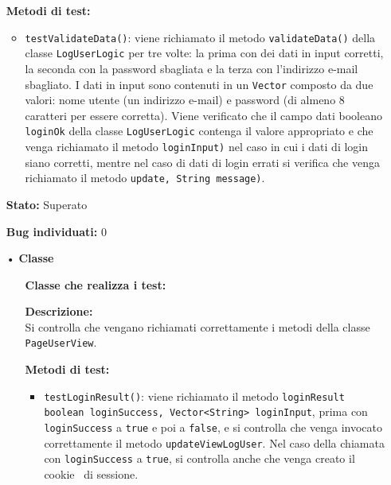 {\begin{sloppypar}
{{\begin{itemize}
\begin{itemize}
					\item[] \textbf{Metodi di test:}{
					\begin{itemize}
						\item \texttt{testValidateData()}: viene richiamato il metodo \texttt{validateData()} della classe \texttt{LogUserLogic} per tre volte: la prima con dei dati in input corretti, la seconda con la password sbagliata e la terza con l'indirizzo e-mail sbagliato. I dati in input sono contenuti in un \texttt{Vector} composto da due valori: nome utente (un indirizzo e-mail) e password (di almeno 8 caratteri per essere corretta). Viene verificato che il campo dati booleano \texttt{loginOk} della classe \texttt{LogUserLogic} contenga il valore appropriato e che venga richiamato il metodo  \texttt{loginInput)} nel caso in cui i dati di login siano corretti, mentre nel caso di dati di login errati si verifica che venga richiamato il metodo  \texttt{update, String message)}.
					\end{itemize}
					}

					\item[] \textbf{Stato:} Superato

					\item[] \textbf{Bug individuati:} 0\\

				\end{itemize}
			\end{itemize}
			
			\begin{itemize}
			\item[•]\textbf{Classe }
				\begin{itemize}
					\item[] \textbf{Classe che realizza i test:}\\

					\item[] \textbf{Descrizione:}\\
					Si controlla che vengano richiamati correttamente i metodi della classe \texttt{PageUserView}.
					
					\item[] \textbf{Metodi di test:}{
					\begin{itemize}
						\item \texttt{testLoginResult()}: viene richiamato il metodo \texttt{loginResult boolean loginSuccess, Vector<String> loginInput}, prima con \texttt{loginSuccess} a \texttt{true} e poi a \texttt{false}, e si controlla che venga invocato correttamente il metodo \texttt{updateViewLogUser}. Nel caso della chiamata con \texttt{loginSuccess} a \texttt{true}, si controlla anche che venga creato il cookie\g~ di sessione.
						

\end{itemize}}
\end{itemize}
\end{itemize}}}
\end{sloppypar}}
